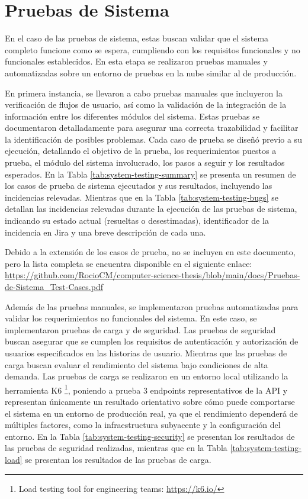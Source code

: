 \section{Pruebas de Sistema}

En el caso de las pruebas de sistema, estas buscan validar que el sistema completo funcione como se espera, cumpliendo con los requisitos funcionales y no funcionales establecidos. En esta etapa se realizaron pruebas manuales y automatizadas sobre un entorno de pruebas en la nube similar al de producción.

En primera instancia, se llevaron a cabo pruebas manuales que incluyeron la verificación de flujos de usuario, así como la validación de la integración de la información entre los diferentes módulos del sistema. Estas pruebas se documentaron detalladamente para asegurar una correcta trazabilidad y facilitar la identificación de posibles problemas. Cada caso de prueba se diseñó previo a su ejecución, detallando el objetivo de la prueba, los requerimientos puestos a prueba, el módulo del sistema involucrado, los pasos a seguir y los resultados esperados. En la Tabla \ref{tab:system-testing-summary} se presenta un resumen de los casos de prueba de sistema ejecutados y sus resultados, incluyendo las incidencias relevadas. Mientras que en la Tabla \ref{tab:system-testing-bugs} se detallan las incidencias relevadas durante la ejecución de las pruebas de sistema, indicando su estado actual (resueltas o desestimadas), identificador de la incidencia en Jira y una breve descripción de cada una.

Debido a la extensión de los casos de prueba, no se incluyen en este documento, pero la lista completa se encuentra disponible en el siguiente enlace: \url{https://github.com/RocioCM/computer-science-thesis/blob/main/docs/Pruebas-de-Sistema_Test-Cases.pdf}

Además de las pruebas manuales, se implementaron pruebas automatizadas para validar los requerimientos no funcionales del sistema. En este caso, se implementaron pruebas de carga y de seguridad. Las pruebas de seguridad buscan asegurar que se cumplen los requisitos de autenticación y autorización de usuarios especificados en las historias de usuario. Mientras que las pruebas de carga buscan evaluar el rendimiento del sistema bajo condiciones de alta demanda. Las pruebas de carga se realizaron en un entorno local utilizando la herramienta K6 \footnote{Load testing tool for engineering teams: \url{https://k6.io/}}, poniendo a prueba 3 endpoints representativos de la API y representan únicamente un resultado orientativo sobre cómo puede comportarse el sistema en un entorno de producción real, ya que el rendimiento dependerá de múltiples factores, como la infraestructura subyacente y la configuración del entorno. En la Tabla \ref{tab:system-testing-security} se presentan los resultados de las pruebas de seguridad realizadas, mientras que en la Tabla \ref{tab:system-testing-load} se presentan los resultados de las pruebas de carga.

